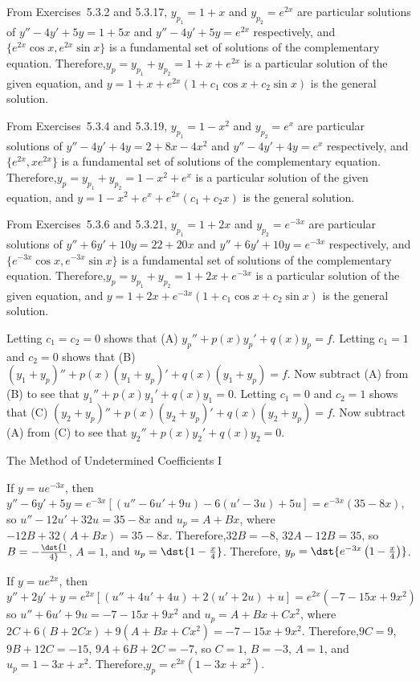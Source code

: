 \documentclass[dvips]{book}
\renewcommand{\exer}[1]{\par\medskip\;\noindent{\color{red}\bf #1.}}
\numberwithin{example}{section}
\numberwithin{equation}{section}
\numberwithin{theorem}{section}
\numberwithin{table}{section}
\numberwithin{figure}{section}
\begin{document}
\exer{5.3.34}
From Exercises~5.3.2 and 5.3.17,
$y_{p_1}=1+x$ and $y_{p_2}=e^{2x}$  are particular solutions of
$y''-4y'+5y=1+5x$
and
$y''-4y'+5y=e^{2x}$
respectively, and $\{e^{2x}\cos x,e^{2x}\sin x\}$
is a fundamental set of solutions of the  complementary equation.
Therefore,$y_p=y_{p_1}+y_{p_2}=1+x+e^{2x}$
is a particular solution of the given equation, and
$y=1+x+e^{2x}(1+c_1\cos x+c_2\sin x)$
is the general solution.


\exer{5.3.36}
From Exercises~5.3.4 and 5.3.19,
$y_{p_1}=1-x^2$ and $y_{p_2}=e^{x}$  are particular solutions of
$y''-4y'+4y=2+8x-4x^2$
and
$y''-4y'+4y=e^{x}$
respectively, and $\{e^{2x},xe^{2x}\}$
is a fundamental set of solutions of the complementary equation.
Therefore,$y_p=y_{p_1}+y_{p_2}=1-x^2+e^{x}$
is a particular solution of the given equation, and
$y=1-x^2+e^{x}+e^{2x}(c_1+c_2x)$
is the general solution.


\exer{5.3.38}
From Exercises~5.3.6 and 5.3.21,
$y_{p_1}=1+2x$ and $y_{p_2}=e^{-3x}$  are particular solutions of
$y''+6y'+10y=22+20x$
and
$y''+6y'+10y=e^{-3x}$
respectively, and $\{e^{-3x}\cos x,e^{-3x}\sin x\}$
is a fundamental set of solutions of the complementary equation.
Therefore,$y_p=y_{p_1}+y_{p_2}=1+2x+e^{-3x}$
is a particular solution of the given equation, and
$y=1+2x+e^{-3x}(1+c_1\cos x+c_2\sin x)$
is the general solution.

\exer{5.3.40}
Letting $c_1=c_2=0$ shows that (A) $y_p''+p(x)y_p'+q(x)y_p=f$.
Letting $c_1=1$ and $c_2=0$ shows that  (B) $(y_1+y_p)''+
p(x)(y_1+y_p)'+q(x)(y_1+y_p)=f$. Now subtract (A) from (B)
to see that $y_1''+p(x)y_1'+q(x)y_1=0$.
Letting $c_1=0$ and $c_2=1$ shows that  (C) $(y_2+y_p)''+
p(x)(y_2+y_p)'+q(x)(y_2+y_p)=f$. Now subtract (A) from (C)
to see that $y_2''+p(x)y_2'+q(x)y_2=0$.


{The Method of Undetermined Coefficients I}
\renewcommand{\thissection}{}
\thissection

\vspace*{-17.5pt}

\exer{5.4.2}
If $y=ue^{-3x}$, then
$y''-6y'+5y=e^{-3x}\left[(u''-6u'+9u)-6(u'-3u)+5u\right]=
e^{-3x}(35-8x)$, so $u''-12u'+32u =35-8x$ and $u_p=A+Bx$, where
$-12B+32(A+Bx)=35-8x$. Therefore,$32B=-8$, $32A-12B=35$, so
$B=-\dst{1\over4}$, $A=1$, and $u_p=\dst{1-{x\over4}}$. Therefore,
$y_p=\dst{e^{-3x}\left(1-{x\over4}\right)}$.

\exer{5.4.4}
If $y=ue^{2x}$, then
$y''+2y'+y=e^{2x}\left[(u''+4u'+4u)+2(u'+2u)+u\right]=
e^{2x}(-7-15x+9x^2)$ so $u''+6u'+9u =-7-15x+9x^2$ and $u_p=A+Bx+Cx^2$,
where $2C+6(B+2Cx)+9(A+Bx+Cx^2)=-7-15x+9x^2$. Therefore,$9C=9$,
$9B+12C=-15$, $9A+6B+2C=-7$, so $C=1$, $B=-3$, $A=1$, and
$u_p=1-3x+x^2$. Therefore,$y_p=e^{2x}(1-3x+x^2)$.
\end{document}
